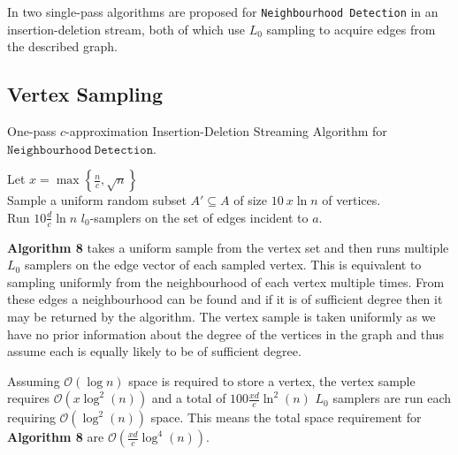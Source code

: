 \documentclass[11pt,twoside,a4paper]{report}
\begin{document}

In \cite{orig} two single-pass algorithms are proposed for \texttt{Neighbourhood Detection} in an insertion-deletion stream, both of which use $L_0$ sampling to acquire edges from the described graph.

\subsection{Vertex Sampling}

\begin{algorithm}
	\caption{One-pass $c$-approximation Insertion-Deletion Streaming Algorithm for $\mathtt{Neighbourhood\ Detection}$. }
	Let $x=\max\left\{\frac{n}{c},\sqrt{n}\right\}$\\
	Sample a uniform random subset $A'\subseteq A$ of size $10\ x\ln n$ of vertices.\\
	 {
		Run $10\frac{d}{c}\ln n$ $l_0$-samplers on the set of edges incident to $a$.
	}
\end{algorithm}
\par\textbf{Algorithm 8} takes a uniform sample from the vertex set and then runs multiple $L_0$ samplers on the edge vector of each sampled vertex. This is equivalent to sampling uniformly from the neighbourhood of each vertex multiple times. From these edges a neighbourhood can be found and if it is of sufficient degree then it may be returned by the algorithm. The vertex sample is taken uniformly as we have no prior information about the degree of the vertices in the graph and thus assume each is equally likely to be of sufficient degree.

\par Assuming $\mathcal{O}(\log n)$ space is required to store a vertex, the vertex sample requires $\mathcal{O}(x\log^2(n))$ and a total of $100\frac{xd}{c}\ln^2(n)$ $L_0$ samplers are run each requiring $\mathcal{O}(\log^2(n))$ space. This means the total space requirement for \textbf{Algorithm 8} are $\mathcal{O}(\frac{xd}{c}\log^4(n))$.
\end{document}
